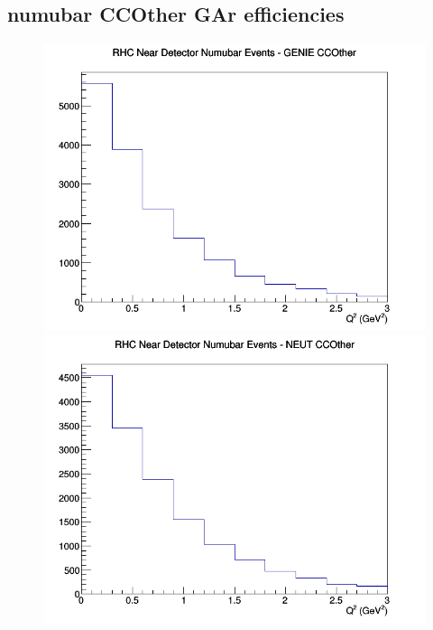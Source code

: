 \subsection{numubar CCOther GAr efficiencies}
\begin{figure}[h]
\includegraphics[width=\linewidth]{eff_Q2/GAr/CCOther_RHC_ND_numubar_Q2_GENIE.png}
\endminipage
{}
\includegraphics[width=\linewidth]{eff_Q2/GAr/CCOther_RHC_ND_numubar_Q2_NEUT.png}
\endminipage
{}

\end{figure}
